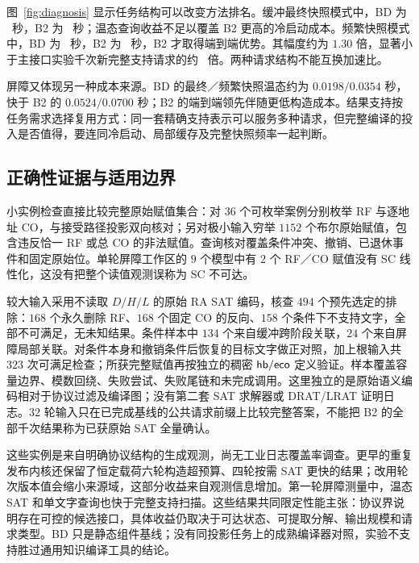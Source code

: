 图~\ref{fig:diagnosis} 显示任务结构可以改变方法排名。缓冲最终快照模式中，BD 为 \BufferSparseBD\ 秒，B2 为 \BufferSparseBTwo\ 秒；温态查询收益不足以覆盖 B2 更高的冷启动成本。频繁快照模式中，BD 为 \BufferDenseBD\ 秒，B2 为 \BufferDenseBTwo\ 秒，B2 才取得端到端优势。其幅度约为 $1.30$ 倍，显著小于主接口实验千次新完整支持请求的约 \BufferRatio\ 倍。两种请求结构不能互换加速比。

屏障又体现另一种成本来源。BD 的最终／频繁快照温态约为 $0.0198/0.0354$ 秒，快于 B2 的 $0.0524/0.0700$ 秒；B2 的端到端领先伴随更低构造成本。结果支持按任务需求选择复用方式：同一套精确支持表示可以服务多种请求，但完整编译的投入是否值得，要连同冷启动、局部缓存及完整快照频率一起判断。

\subsection{正确性证据与适用边界}
小实例检查直接比较完整原始赋值集合：对 $36$ 个可枚举案例分别枚举 RF 与逐地址 CO，与接受路径投影双向核对；另对极小输入穷举 $1152$ 个布尔原始赋值，包含违反恰一 RF 或总 CO 的非法赋值。查询核对覆盖条件冲突、撤销、已退休事件和固定原始位。单轮屏障工作区的 $9$ 个模型中有 $2$ 个 RF／CO 赋值没有 SC 线性化，这没有把整个读值观测误称为 SC 不可达。

较大输入采用不读取 $D/H/L$ 的原始 RA SAT 编码，核查 $494$ 个预先选定的排除：$168$ 个永久删除 RF、$168$ 个固定 CO 的反向、$158$ 个条件下不支持文字，全部不可满足，无未知结果。条件样本中 $134$ 个来自缓冲跨阶段关联，$24$ 个来自屏障局部关联。对条件本身和撤销条件后恢复的目标文字做正对照，加上根输入共 $323$ 次可满足检查；所获完整赋值再按独立的稠密 $\mathsf{hb}/\mathsf{eco}$ 定义验证。样本覆盖容量边界、模数回绕、失败尝试、失败尾链和未完成调用。这里独立的是原始语义编码相对于协议过滤及编译图；没有第二套 SAT 求解器或 DRAT/LRAT 证明日志。$32$ 轮输入只在已完成基线的公共请求前缀上比较完整答案，不能把 B2 的全部千次结果称为已获原始 SAT 全量确认。

这些实例是来自明确协议结构的生成观测，尚无工业日志覆盖率调查。更早的重复发布内核还保留了恒定载荷六轮构造超预算、四轮按需 SAT 更快的结果；改用轮次版本值会缩小来源域，这部分收益来自观测信息增加。第一轮屏障测量中，温态 SAT 和单文字查询也快于完整支持扫描。这些结果共同限定性能主张：协议界说明存在可控的候选接口，具体收益仍取决于可达状态、可提取分解、输出规模和请求类型。BD 只是静态组件基线；没有同投影任务上的成熟编译器对照，实验不支持胜过通用知识编译工具的结论。
